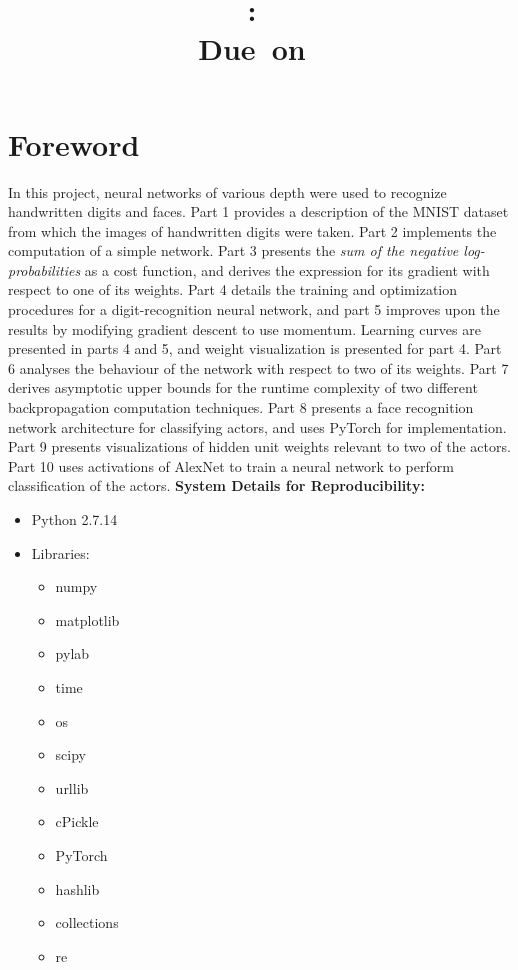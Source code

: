 \documentclass{article}
\title{
\vspace{2in}
\textmd{\textbf{\hmwkClass:\ \hmwkTitle}}\\
\normalsize\vspace{0.1in}\small{Due\ on\ \hmwkDueDate}\\
\vspace{0.1in}
\vspace{3in}
}
\author{\textbf{\hmwkAuthorName}}
\begin{document}
\maketitle
\clearpage
\clearpage
\section{Foreword}
In this project, neural networks of various depth were used to recognize handwritten digits and faces.
\newline
\newline
Part 1 provides a description of the MNIST dataset from which the images of handwritten digits were taken. Part 2 implements the computation of a simple network. Part 3 presents the \textit{sum of the negative log-probabilities} as a cost function, and derives the expression for its gradient with respect to one of its weights. Part 4 details the training and optimization procedures for a digit-recognition neural network, and part 5 improves upon the results by modifying gradient descent to use momentum. Learning curves are presented in parts 4 and 5, and weight visualization is presented for part 4. Part 6 analyses the behaviour of the network with respect to two of its weights. Part 7 derives asymptotic upper bounds for the runtime complexity of two different backpropagation computation techniques. Part 8 presents a face recognition network architecture for classifying actors, and uses PyTorch for implementation. Part 9 presents visualizations of hidden unit weights relevant to two of the actors. Part 10 uses activations of AlexNet to train a neural network to perform classification of the actors.
\newline
\newline
\textbf{System Details for Reproducibility:}
\begin{itemize}
	\item Python 2.7.14
	\item Libraries:
	\begin{itemize}
		\item numpy
		\item matplotlib
		\item pylab
		\item time
		\item os
		\item scipy
		\item urllib
		\item cPickle
		\item PyTorch
		\item hashlib
		\item collections
		\item re
	\end{itemize}
\end{itemize}
\clearpage
\end{document}
